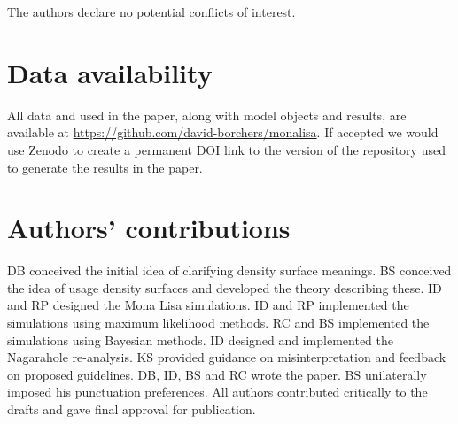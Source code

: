 \documentclass[10pt,a4paper]{article}
\begin{document}
The authors declare no potential conflicts of interest.

\section*{Data availability}

All data and used in the paper, along with model objects and results, are available at \url{https://github.com/david-borchers/monalisa}. If accepted we would use Zenodo to create a permanent DOI link to the version of the repository used to generate the results in the paper.

\section*{Authors' contributions} 
DB conceived the initial idea of clarifying density surface meanings. BS conceived the idea of usage density surfaces and developed the theory describing these. ID and RP designed the Mona Lisa simulations. ID and RP implemented the simulations using maximum likelihood methods. RC and BS implemented the simulations using Bayesian methods. ID designed and implemented the Nagarahole re-analysis. KS provided guidance on misinterpretation and feedback on proposed guidelines. DB, ID, BS and RC wrote the paper. BS unilaterally imposed his punctuation preferences. All authors contributed critically to the drafts and gave final approval for publication.



\end{document}
